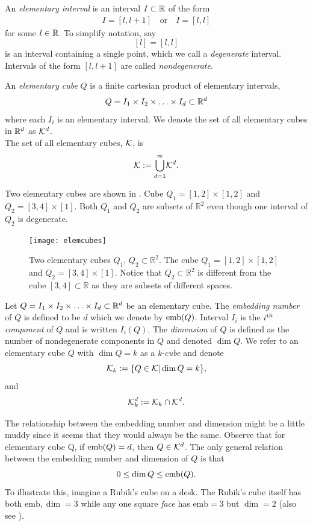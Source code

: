 \begin{defn}
	An \textit{elementary interval} is an interval $I \subset \mathbb{R}$ of the form
	\begin{align*}
		I = [ l, l+1 ] \quad \text{or} \quad I = [l,l]
	\end{align*}
	for some $l \in \mathbb{R}$. To simplify notation, say $$[l] = [l, l]$$ is an interval containing a single point, which we call a \textit{degenerate} interval. Intervals of the form $[l, l+1]$ are called \textit{nondegenerate}.
\end{defn}

\begin{defn}
	An \textit{elementary cube} $Q$ is a finite cartesian product of elementary intervals, $$ Q = I_1 \times I_2 \times \ldots \times I_d \subset \mathbb{R}^d $$ where each $I_i$ is an elementary interval. We denote the set of all elementary cubes in $\mathbb{R}^d$ as $\mathcal{K}^{d}$. \\
	The set of all elementary cubes, $\mathcal{K}$, is
	$$ \mathcal{K} := { \bigcup_{d=1}^{\infty} } \mathcal{K}^{d} . $$
\end{defn}

Two elementary cubes are shown in . Cube $Q_1 = [1,2] \times [1,2]$ and $Q_2 = [3,4] \times [1]$. Both $Q_1$ and $Q_2$ are subsets of $\mathbb{R}^2$ even though one interval of $Q_2$ is degenerate.

\begin{figure}
	\centering
	\texttt{[image: elemcubes]}
	\caption{Two elementary cubes $Q_1, \, Q_2 \subset \mathbb{R}^2.$ The cube $Q_1 = [1,2] \times [1,2]$ and $Q_2 = [3,4] \times [1]$. Notice that $Q_2 \subset \mathbb{R}^2$ is different from the cube $[3,4] \subset \mathbb{R}$ as they are subsets of different spaces.}
	\label{fig:elemcubes}
\end{figure}

\begin{defn}
	Let $Q = I_1 \times I_2 \times \ldots \times I_d \subset \mathbb{R}^d$ be an elementary cube. The \textit{embedding number} of $Q$ is defined to be $d$ which we denote by $\mathord{\mathrm{emb}(Q)}$. Interval $I_i$ is the $i\textsuperscript{th}$ \textit{component} of $Q$ and is written $\mathord{I_i(Q)}$. The \textit{dimension} of $Q$ is defined as the number of nondegenerate components in $Q$ and denoted $\dim{Q}$. We refer to an elementary cube $Q$ with $\dim{Q} = k$ as a \textit{k-cube} and denote
	$$ \mathcal{K}_k := \{ Q \in \mathcal{K} | \dim{Q} = k \},$$ and
	$$ \mathcal{K}_{k}^{d} := \mathcal{K}_k \cap \mathcal{K}^{d}. $$
\end{defn}
The relationship between the embedding number and dimension might be a little muddy since it seems that they would always be the same. Observe that for elementary cube {Q}, if $\mathord{\mathrm{emb}(Q)} = d$, then $Q \in \mathcal{K}^{d}$. The only general relation between the embedding number and dimension of $Q$ is that $$ 0 \leq \dim{Q} \leq \mathord{\mathrm{emb}(Q)} .$$ To illustrate this, imagine a Rubik's cube on a desk. The Rubik's cube itself has both $\text{emb}, \dim = 3$ while any one square \textit{face} has $\text{emb} = 3$ but $\dim = 2$ (also see ).


